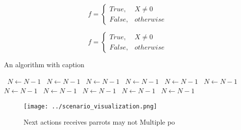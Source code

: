 \documentclass[a4paper]{article}
\begin{document}
\begin{equation}   f =
\begin{cases} True, & X \neq 0\\
False, & otherwise
\end{cases}
\end{equation}

\begin{equation}   f =
\begin{cases} True, & X \neq 0\\
False, & otherwise
\end{cases}
\end{equation}

\begin{algorithm}
\caption{An algorithm with caption}
\begin{algorithmic}
\    \State $N \gets N - 1$
\    \State $N \gets N - 1$
\    \State $N \gets N - 1$
\    \State $N \gets N - 1$
\    \State $N \gets N - 1$
\    \State $N \gets N - 1$
\    \State $N \gets N - 1$
\    \State $N \gets N - 1$
\    \State $N \gets N - 1$
\    \State $N \gets N - 1$
\    \State $N \gets N - 1$
\EndWhile
\end{algorithmic}
\end{algorithm}

\begin{figure}
\centering
\texttt{[image: ../scenario\_visualization.png]}
\caption{Next actions receives parrots may not Multiple po
}
\end{figure}
 
\end{document}
